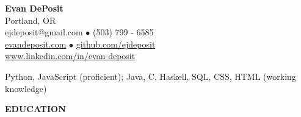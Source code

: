 \documentclass[11pt]{article}
\begin{document}
\thispagestyle{empty}
\begin{center}
\noindent \Large{\textbf{Evan DePosit}}\\
\large{Portland, OR}\\
\large{ejdeposit@gmail.com $\bullet$ (503) 799 - 6585}\\
\href{http://evandeposit.com}{\large{evandeposit.com}} $\bullet$
\href{http://github.com/ejdeposit}{\large{github.com/ejdeposit}}\\
\href{http://www.linkedin.com/in/evan-deposit}{\large{www.linkedin.com/in/evan-deposit}}
\end{center}
\medskip
\begin{description}[style=multiline,leftmargin=3.2cm,font=\normalfont]
\item[\textbf{LANGUAGES:}] Python, JavaScript (proficient); Java, C,  Haskell, SQL, CSS, HTML (working knowledge)
\end{description}
\noindent
\makebox[0pt][l]{\rule[-.2\baselineskip]{\linewidth}{.3mm}}%
\large{\textbf{EDUCATION}} \smallskip \\
\end{document}
